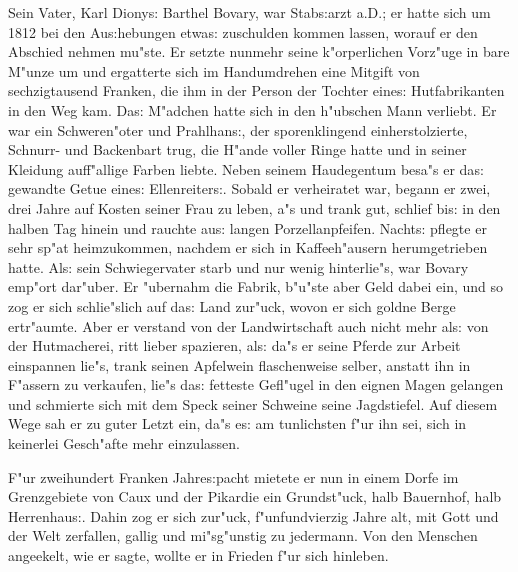 \documentclass[oneside,12pt]{book}
\newcommand{\s}{s:}%
\begin{document}
Sein Vater, Karl Diony{\s} Barthel Bovary, war Stab{\s}arzt a.D.;
er hatte sich um 1812 bei den Au{\s}hebungen etwa{\s} zuschulden
kommen lassen, worauf er den Abschied nehmen mu"ste. Er setzte
nunmehr seine k"orperlichen Vorz"uge in bare M"unze um und
ergatterte sich im Handumdrehen eine Mitgift von sechzigtausend
Franken, die ihm in der Person der Tochter eine{\s} Hutfabrikanten
in den Weg kam. Da{\s} M"adchen hatte sich in den h"ubschen Mann
verliebt. Er war ein Schweren"oter und Prahlhan{\s}, der
sporenklingend einherstolzierte, Schnurr- und Backenbart trug, die
H"ande voller Ringe hatte und in seiner Kleidung auff"allige
Farben liebte. Neben seinem Haudegentum besa"s er da{\s} gewandte
Getue eine{\s} Ellenreiter{\s}. Sobald er verheiratet war, begann
er zwei, drei Jahre auf Kosten seiner Frau zu leben, a"s und trank
gut, schlief bi{\s} in den halben Tag hinein und rauchte au{\s}
langen Porzellanpfeifen. Nacht{\s} pflegte er sehr sp"at
heimzukommen, nachdem er sich in Kaffeeh"ausern herumgetrieben
hatte. Al{\s} sein Schwiegervater starb und nur wenig hinterlie"s,
war Bovary emp"ort dar"uber. Er "ubernahm die Fabrik, b"u"ste aber
Geld dabei ein, und so zog er sich schlie"slich auf da{\s} Land
zur"uck, wovon er sich goldne Berge ertr"aumte. Aber er verstand
von der Landwirtschaft auch nicht mehr al{\s} von der Hutmacherei,
ritt lieber spazieren, al{\s} da"s er seine Pferde zur Arbeit
einspannen lie"s, trank seinen Apfelwein flaschenweise selber,
anstatt ihn in F"assern zu verkaufen, lie"s da{\s} fetteste
Gefl"ugel in den eignen Magen gelangen und schmierte sich mit dem
Speck seiner Schweine seine Jagdstiefel. Auf diesem Wege sah er zu
guter Letzt ein, da"s e{\s} am tunlichsten f"ur ihn sei, sich in
keinerlei Gesch"afte mehr einzulassen.

F"ur zweihundert Franken Jahre{\s}pacht mietete er nun in einem
Dorfe im Grenzgebiete von Caux und der Pikardie ein Grundst"uck,
halb Bauernhof, halb Herrenhau{\s}. Dahin zog er sich zur"uck,
f"unfundvierzig Jahre alt, mit Gott und der Welt zerfallen, gallig
und mi"sg"unstig zu jedermann. Von den Menschen angeekelt, wie er
sagte, wollte er in Frieden f"ur sich hinleben.
\end{document}

